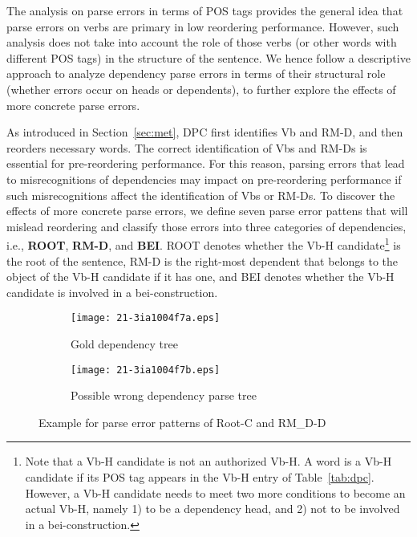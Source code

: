 \documentclass[english]{jnlp_1.4}
\begin{document}
The analysis on parse errors in terms of POS tags provides the general idea that parse
errors on verbs are primary in low reordering performance.
However, such analysis does not take into account the role of those verbs
(or other words with different POS tags) in the structure of the sentence.
We hence follow a descriptive approach to analyze dependency parse errors
in terms of their structural role (whether errors occur on heads or dependents),
to further explore the effects of more concrete parse errors.

As introduced in Section~\ref{sec:met}, DPC first identifies Vb and RM-D, and 
then reorders necessary words.
The correct identification of Vbs and RM-Ds is essential for pre-reordering performance.
For this reason, parsing errors that lead to misrecognitions of dependencies
may impact on pre-reordering performance if such misrecognitions
affect the identification of Vbs or RM-Ds.
To discover the effects of more concrete parse 
errors, we define seven parse error pattens that will mislead reordering
and classify those errors into three categories of dependencies, i.e., {\bf ROOT}, {\bf RM-D}, 
and {\bf BEI}. ROOT denotes whether the Vb-H candidate\footnote{Note that a Vb-H candidate is not an authorized Vb-H.
A word is a Vb-H candidate if its POS tag appears in the Vb-H entry of Table~\ref{tab:dpc}.
However, a Vb-H candidate needs to meet two more conditions to become an actual Vb-H, namely
1) to be a dependency head, and 2) not to be involved in a bei-construction.}
is the root of the sentence, 
RM-D is the right-most dependent that belongs to the object of the Vb-H candidate if it has 
one, and BEI denotes whether the Vb-H candidate is involved in a bei-construction. 

\begin{figure}[t]
\begin{subfigure}{1\textwidth}
\begin{center}
\texttt{[image: 21-3ia1004f7a.eps]}
\end{center}
\caption{Gold dependency tree}
\label{fig:rmddrootg}
\end{subfigure}
\vspace{0.5\Cvs}

\begin{subfigure}{1\textwidth}
\begin{center}
\texttt{[image: 21-3ia1004f7b.eps]}
\end{center}
\caption{Possible wrong dependency parse tree}
\label{fig:rmddrootc}
\end{subfigure}
\caption{Example for parse error patterns of Root-C and RM\_D-D}
\label{fig:rmddrootgc}
\end{figure}
\end{document}
